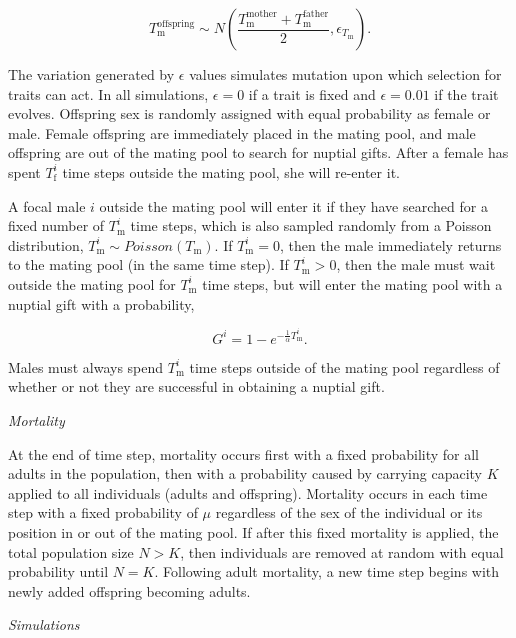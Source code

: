 \documentclass[
]{article}
\begin{document}
\[T^{\mathrm{offspring}}_{\mathrm{m}} \sim N\left(\frac{T^{\mathrm{mother}}_{\mathrm{m}}  + T^{\mathrm{father}}_{\mathrm{m}}}{2}, \epsilon_{T_{\mathrm{m}}} \right).\]

The variation generated by \(\epsilon\) values simulates mutation upon
which selection for traits can act. In all simulations, \(\epsilon = 0\)
if a trait is fixed and \(\epsilon = 0.01\) if the trait evolves.
Offspring sex is randomly assigned with equal probability as female or
male. Female offspring are immediately placed in the mating pool, and
male offspring are out of the mating pool to search for nuptial gifts.
After a female has spent \(T^{i}_{\mathrm{f}}\) time steps outside the
mating pool, she will re-enter it.

A focal male \(i\) outside the mating pool will enter it if they have
searched for a fixed number of \(T^{i}_{\mathrm{m}}\) time steps, which
is also sampled randomly from a Poisson distribution,
\(T^{i}_{\mathrm{m}} \sim Poisson(T_{\mathrm{m}})\). If
\(T^{i}_{\mathrm{m}} = 0\), then the male immediately returns to the
mating pool (in the same time step). If \(T^{i}_{\mathrm{m}} > 0\), then
the male must wait outside the mating pool for \(T^{i}_{\mathrm{m}}\)
time steps, but will enter the mating pool with a nuptial gift with a
probability,

\[G^{i} = 1 - e^{-\frac{1}{\alpha}T^{i}_{\mathrm{m}}}.\]

Males must always spend \(T^{i}_{\mathrm{m}}\) time steps outside of the
mating pool regardless of whether or not they are successful in
obtaining a nuptial gift.

\emph{Mortality}

At the end of time step, mortality occurs first with a fixed probability
for all adults in the population, then with a probability caused by
carrying capacity \(K\) applied to all individuals (adults and
offspring). Mortality occurs in each time step with a fixed probability
of \(\mu\) regardless of the sex of the individual or its position in or
out of the mating pool. If after this fixed mortality is applied, the
total population size \(N > K\), then individuals are removed at random
with equal probability until \(N = K\). Following adult mortality, a new
time step begins with newly added offspring becoming adults.

\emph{Simulations}
\end{document}
